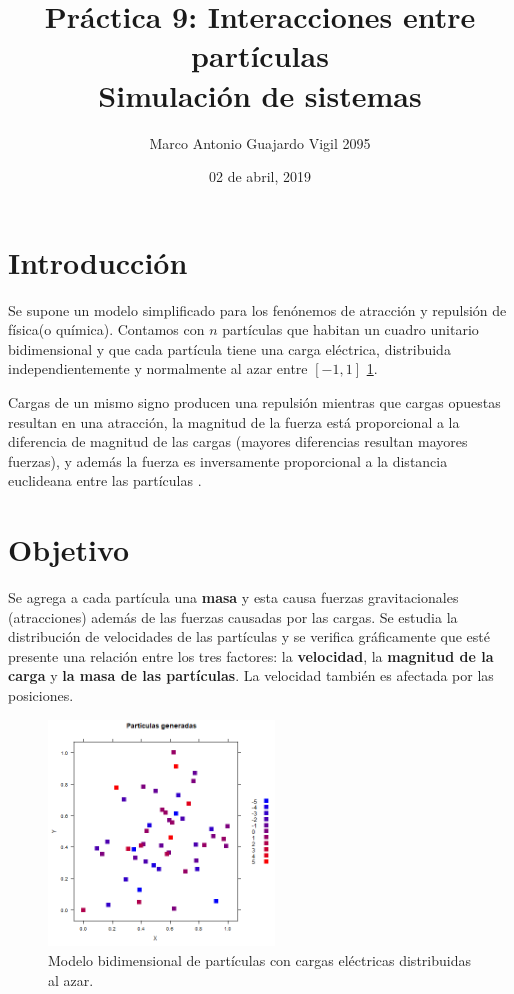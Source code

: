 \documentclass{article}
\author{Marco Antonio Guajardo Vigil  2095}
\title{\textbf{Pr\'actica 9: Interacciones entre part\'iculas} \\ Simulaci\'on de sistemas}
\date{02 de abril, 2019}
\begin{document}
\maketitle

\section{Introducci\'on}
Se supone un modelo simplificado para los fen\'onemos de atracci\'on y repulsi\'on de f\'isica(o qu\'imica). Contamos con $n$ part\'iculas que habitan un cuadro unitario bidimensional y que cada part\'icula tiene una carga el\'ectrica, distribuida independientemente y normalmente al azar entre $[-1,1]$ \ref{fig:modelo}.

Cargas de un mismo signo producen una repulsi\'on mientras que cargas opuestas resultan en una atracci\'on, la magnitud de la fuerza est\'a proporcional a la diferencia de magnitud de las cargas (mayores diferencias resultan mayores fuerzas), y adem\'as la fuerza es inversamente proporcional a la distancia euclideana entre las part\'iculas \cite{SatuP9}.

\section{Objetivo}

Se agrega a cada part\'icula una \textbf{masa} y esta causa fuerzas gravitacionales (atracciones) adem\'as de las fuerzas causadas por las cargas. Se estudia la distribuci\'on de velocidades de las part\'iculas y se verifica gr\'aficamente que est\'e presente una relaci\'on entre los tres factores: la \textbf{velocidad}, la \textbf{magnitud de la carga} y \textbf{la masa de las part\'iculas}. La velocidad tambi\'en es afectada por las posiciones.

\begin{figure}[h!]
\centering\includegraphics[width=60mm]{p9i.png}
\caption{Modelo bidimensional de part\'iculas con cargas el\'ectricas distribuidas al azar.}
\label{fig:modelo}
\end{figure}
\end{document}
